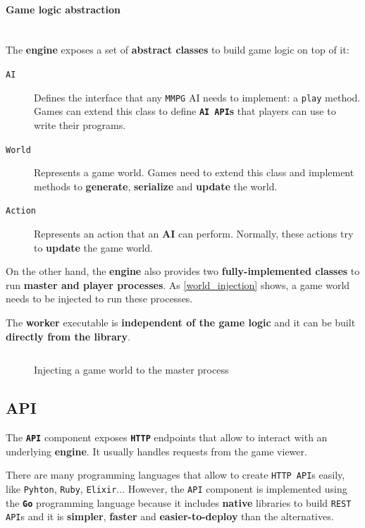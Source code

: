 \documentclass[a4paper,11pt]{article}
\begin{document}
\paragraph{Game logic abstraction}
\hfill
\\[0.2cm]
\indent
The \textbf{engine} exposes a set of \textbf{abstract classes} to build game logic on top of it:
\begin{description}
\item[\texttt{AI}]
Defines the interface that any \texttt{MMPG} AI needs to implement: a \texttt{play} method. Games can extend
  this class to define \textbf{\texttt{AI API}s} that players can use to write their programs.
\item[\texttt{World}]
Represents a game world. Games need to extend this class and implement methods to
  \textbf{generate}, \textbf{serialize} and \textbf{update} the world.
\item[\texttt{Action}]
Represents an action that an \textbf{AI} can perform. Normally, these actions try to \textbf{update}
  the game world.
\end{description}
On the other hand, the \textbf{engine} also provides two \textbf{fully-implemented classes} to run \textbf{master and player
processes}. As \autoref{world_injection} shows, a game world needs to be injected to run these processes.

The \textbf{worker} executable is \textbf{independent of the game logic} and it can be built \textbf{directly from the library}.
\begin{figure}[H]
\inputminted[linenos,fontsize=\small,frame=lines,framesep=2mm]{c++}{code/master.cpp}
\caption{Injecting a game world to the master process}
\label{world_injection}
\end{figure}
\subsection{API}
The \textbf{\texttt{API}} component exposes \textbf{\texttt{HTTP}} endpoints that allow to interact with an underlying \textbf{engine}. It
usually handles requests from the game viewer.

There are many programming languages that allow to create \texttt{HTTP API}s easily, like \texttt{Pyhton}, \texttt{Ruby}, \texttt{Elixir}... However,
the \texttt{API} component is implemented using the \textbf{\texttt{Go}} programming language because it includes \textbf{native}
libraries to build \texttt{REST API}s and it is \textbf{simpler}, \textbf{faster} and \textbf{easier-to-deploy} than the alternatives.
\end{document}
